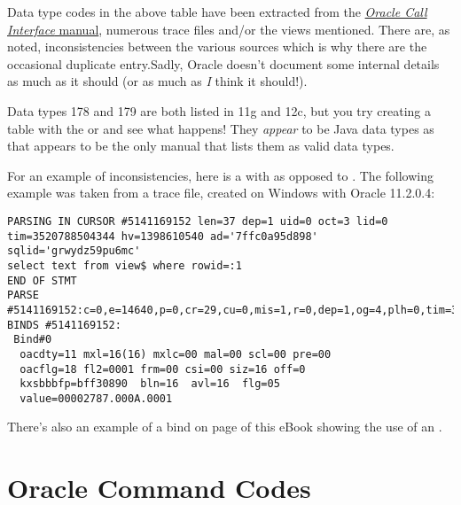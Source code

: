 \begin{appendix}
\begin{longtable}[]{@{}r|l@{}}
\bottomrule
\end{longtable}

Data type codes in the above table have been extracted from the \href{http://docs.oracle.com/database/122/LNOCI/data-types.htm\#LNOCI16266}{\emph{Oracle Call
Interface} manual}, numerous trace files and/or the views mentioned. There are, as noted, inconsistencies between the various sources which is why there are the occasional duplicate entry.Sadly, Oracle doesn't document some internal details as much as it should (or as much as \textit{I} think it should!).

\begin{note}
Data types 178 and 179 are both listed in 11g and 12c, but you try creating a table with the  or  and see what happens! They \emph{appear} to be Java data types as that appears to be the only manual that lists them as valid data types.
\end{note}

For an example of inconsistencies, here is a  with  as opposed to . The following example was taken from a trace file, created on Windows with Oracle 11.2.0.4:

\begin{lstlisting}[numbers=none,caption={Bind Example - \inline{ROWID} With \inline{oacdty=11}}]
PARSING IN CURSOR #5141169152 len=37 dep=1 uid=0 oct=3 lid=0 tim=3520788504344 hv=1398610540 ad='7ffc0a95d898' sqlid='grwydz59pu6mc'
select text from view$ where rowid=:1
END OF STMT
PARSE #5141169152:c=0,e=14640,p=0,cr=29,cu=0,mis=1,r=0,dep=1,og=4,plh=0,tim=3520788504343
BINDS #5141169152:
 Bind#0
  oacdty=11 mxl=16(16) mxlc=00 mal=00 scl=00 pre=00
  oacflg=18 fl2=0001 frm=00 csi=00 siz=16 off=0
  kxsbbbfp=bff30890  bln=16  avl=16  flg=05
  value=00002787.000A.0001
\end{lstlisting}  
  
There's also an example of a  bind on page \pageref{ref-cursor-102} of this eBook showing the use of an .

\chapter{Oracle Command Codes}\label{oracle-command-codes}


\end{appendix}
